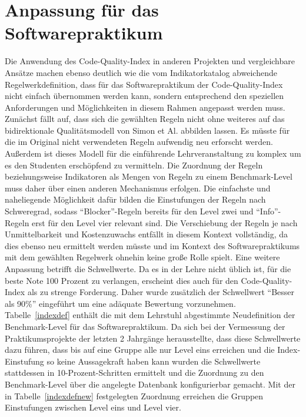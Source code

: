 \documentclass[da,ngerman]{stthesis}
\begin{document}
		\section{Anpassung für das Softwarepraktikum}
			Die Anwendung des Code-Quality-Index in anderen Projekten und vergleichbare Ansätze machen ebenso deutlich wie die vom Indikatorkatalog abweichende Regelwerkdefinition, dass für das Softwarepraktikum der Code-Quality-Index nicht einfach übernommen werden kann, sondern entsprechend den speziellen Anforderungen und Möglichkeiten in diesem Rahmen angepasst werden muss. \newline
			Zunächst fällt auf, dass sich die gewählten Regeln nicht ohne weiteres auf das bidirektionale Qualitätsmodell von Simon et Al. abbilden lassen. Es müsste für die im Original nicht verwendeten Regeln aufwendig neu erforscht werden. Außerdem ist dieses Modell für die einführende Lehrveranstaltung zu komplex um es den Studenten erschöpfend zu vermitteln. Die Zuordnung der Regeln beziehungsweise Indikatoren als Mengen von Regeln zu einem Benchmark-Level muss daher über einen anderen Mechanismus erfolgen. Die einfachste und naheliegende Möglichkeit dafür bilden die Einstufungen der Regeln nach Schweregrad, sodass "`Blocker"'-Regeln bereits für den Level zwei und "`Info"'-Regeln erst für den Level vier relevant sind. Die Verschiebung der Regeln je nach Unmittelbarkeit und Kostenzuwachs entfällt in diesem Kontext vollständig, da dies ebenso neu ermittelt werden müsste und im Kontext des Softwarepraktikums mit dem gewählten Regelwerk ohnehin keine große Rolle spielt. \newline
			Eine weitere Anpassung betrifft die Schwellwerte. Da es in der Lehre nicht üblich ist, für die beste Note 100 Prozent zu verlangen, erscheint dies auch für den Code-Quality-Index als zu strenge Forderung. Daher wurde zusätzlich der Schwellwert "`Besser als 90\%"' eingeführt um eine adäquate Bewertung vorzunehmen. Tabelle~\ref{indexdef} enthält die mit dem Lehrstuhl abgestimmte Neudefinition der Benchmark-Level für das Softwarepraktikum. Da sich bei der Vermessung der Praktikumsprojekte der letzten 2 Jahrgänge herausstellte, dass diese Schwellwerte dazu führen, dass bis auf eine Gruppe alle nur Level eins erreichen und die Index-Einstufung so keine Aussagekraft haben kann wurden die Schwellwerte stattdessen in 10-Prozent-Schritten ermittelt und die Zuordnung zu den Benchmark-Level über die angelegte Datenbank konfigurierbar gemacht. Mit der in Tabelle~\ref{indexdefnew} festgelegten Zuordnung erreichen die Gruppen Einstufungen zwischen Level eins und Level vier. \newline 
\end{document}
